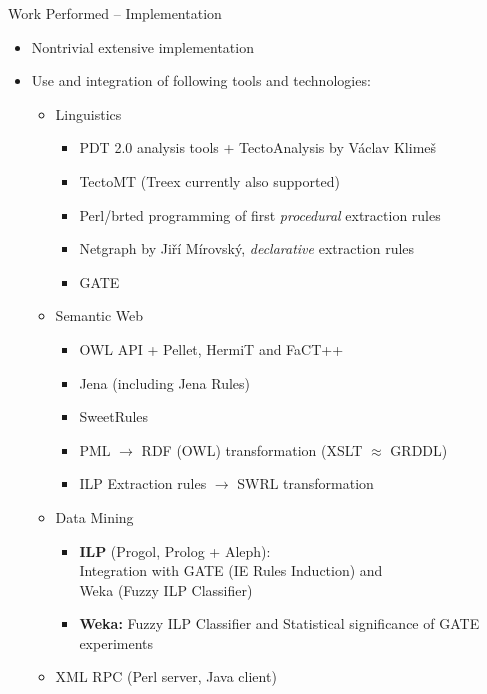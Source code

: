 \documentclass[xcolor=dvipsnames]{beamer}
\begin{document}
\begin{frame}{Work Performed -- Implementation}
\label{implementation}
\begin{itemize}
	\item Nontrivial extensive implementation	
	\item Use and integration of following tools and technologies:
	\begin{itemize}
		\item Linguistics			
		\begin{itemize}
			\item PDT 2.0 analysis tools + TectoAnalysis by Václav Klimeš
			\item TectoMT (Treex currently also supported)
			\item Perl/brted programming of first \emph{procedural} extraction rules
			\item Netgraph by Jiří Mírovský, \emph{declarative} extraction rules
			\item GATE
		\end{itemize}			
		\item Semantic Web			
		\begin{itemize}
			\item OWL API + Pellet, HermiT and FaCT++
			\item Jena (including Jena Rules)
			\item SweetRules
			\item PML $\rightarrow$ RDF (OWL) transformation (XSLT $\approx$ GRDDL)
			\item ILP Extraction rules $\rightarrow$ SWRL transformation
		\end{itemize}			
		\item Data Mining			
		\begin{itemize}
			\item \textbf{ILP} (Progol, Prolog + Aleph):
				\\Integration with GATE (IE Rules Induction) and 
				\\Weka (Fuzzy ILP Classifier)
			\item \textbf{Weka:}
				Fuzzy ILP Classifier and Statistical significance of GATE experiments
		\end{itemize}			
		\item XML RPC (Perl server, Java client)
	\end{itemize}
\end{itemize}
\end{frame}
\end{document}
